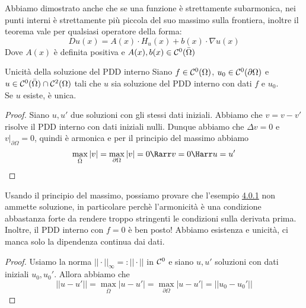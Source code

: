 \documentclass{book}
\begin{document}
\begin{remark}{}{}
    Abbiamo dimostrato anche che se una funzione è strettamente subarmonica, nei punti interni è strettamente più piccola del suo massimo sulla frontiera, inoltre il teorema vale per qualsiasi operatore della forma:
    \[Du(x) = A(x)\cdot H_u(x) + b(x)\cdot \nabla u(x)\]
    Dove $A(x)$ è definita positiva e $A(x),b(x)\in\mathcal{C}^0(\bar{\Omega})$
\end{remark}

\begin{theorem}{Unicità della soluzione del PDD interno}{}
    Siano $f\in\mathcal{C}^0(\Omega)$, $u_0\in \mathcal{C}^0(\partial\Omega)$ e $u\in\mathcal{C}^0(\bar{\Omega})\cap\mathcal{C}^2(\Omega)$ tali che $u$ sia soluzione del PDD interno con dati $f$ e $u_0$.\\
    Se $u$ esiste, è unica.
\end{theorem}
\begin{proof}
    Siano $u,u'$ due soluzioni con gli stessi dati iniziali. Abbiamo che $v = v-v'$ risolve il PDD interno con dati iniziali nulli. Dunque abbiamo che $\Delta v = 0$ e $v|_{\partial\Omega} = 0$, quindi è armonica e per il principio del massimo abbiamo
    \[\max_{\bar{\Omega}}|v| = \max_{\partial\Omega} |v| = 0 \Rarr v=0\Harr u=u' \]
\end{proof}

\begin{remark}{}{}
    Usando il principio del massimo, possiamo provare che l'esempio \href{exmp:4.0.1}{4.0.1} non ammette soluzione, in particolare perchè l'armonicità è una condizione abbastanza forte da rendere troppo stringenti le condizioni sulla derivata prima.\\
    Inoltre, il PDD interno con $f=0$ è ben posto! Abbiamo esistenza e unicità, ci manca solo la dipendenza continua dai dati.
\end{remark}
\begin{proof}
    Usiamo la norma $||\cdot||_\infty =: ||\cdot ||$ in $\mathcal{C}^0$ e siano $u,u'$ soluzioni con dati iniziali $u_0,u_0'$. Allora abbiamo che 
    \[||u-u'|| = \max_{\bar{\Omega}} |u-u'| = \max_{\partial\Omega} |u-u'| = ||u_0-u_0'||\]
\end{proof}
\end{document}
